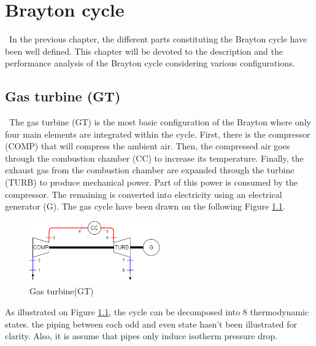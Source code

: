 \graphicspath{{Chapitre_5/Images/}}
\chapter{Brayton cycle}\label{C5}
\quad\, In the previous chapter, the different parts constituting the Brayton cycle have been well defined. This chapter will be devoted to the description and the performance analysis of the Brayton cycle considering various configurations.

\section{Gas turbine (GT)}
\quad\, The gas turbine (GT) is the most basic configuration of the Brayton where only four main elements are integrated within the cycle. First, there is the compressor (COMP) that will compress the ambient air. Then, the compressed air goes through the combustion chamber (CC) to increase its temperature. Finally, the exhaust gas from the combustion chamber are expanded through the turbine (TURB) to produce mechanical power. Part of this power is consumed by the compressor. The remaining is converted into electricity using an electrical generator (G). The gas cycle have been drawn on the following Figure \ref{fig:C5_BraytonGT}.

\begin{figure}[h]
\centering
\includegraphics[width=0.5\textwidth] {GT}
\caption{Gas turbine(GT)}
\label{fig:C5_BraytonGT}
\end{figure}



As illustrated on Figure \ref{fig:C5_BraytonGT}, the cycle can be decomposed into 8 thermodynamic states. the piping between each odd and even state hasn't been illustrated for clarity. Also, it is assume that pipes only induce isotherm pressure drop.


